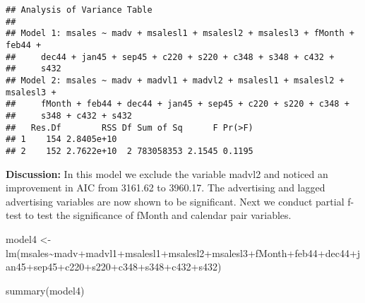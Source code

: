 \documentclass[
]{article}
\newenvironment{Shaded}{\begin{snugshade}}{\end{snugshade}}
\newcommand{\FunctionTok}[1]{\textcolor[rgb]{0.00,0.00,0.00}{#1}}
\newcommand{\NormalTok}[1]{#1}
\newcommand{\OtherTok}[1]{\textcolor[rgb]{0.56,0.35,0.01}{#1}}
\newcommand{\SpecialCharTok}[1]{\textcolor[rgb]{0.00,0.00,0.00}{#1}}
\begin{document}
\begin{verbatim}
## Analysis of Variance Table
## 
## Model 1: msales ~ madv + msalesl1 + msalesl2 + msalesl3 + fMonth + feb44 + 
##     dec44 + jan45 + sep45 + c220 + s220 + c348 + s348 + c432 + 
##     s432
## Model 2: msales ~ madv + madvl1 + madvl2 + msalesl1 + msalesl2 + msalesl3 + 
##     fMonth + feb44 + dec44 + jan45 + sep45 + c220 + s220 + c348 + 
##     s348 + c432 + s432
##   Res.Df        RSS Df Sum of Sq      F Pr(>F)
## 1    154 2.8405e+10                           
## 2    152 2.7622e+10  2 783058353 2.1545 0.1195
\end{verbatim}

\textbf{Discussion:} In this model we exclude the variable madvl2 and
noticed an improvement in AIC from 3161.62 to 3960.17. The advertising
and lagged advertising variables are now shown to be significant. Next
we conduct partial f-test to test the significance of fMonth and
calendar pair variables.

\begin{Shaded}
\begin{Highlighting}[]
\NormalTok{model4 }\OtherTok{\textless{}{-}} \FunctionTok{lm}\NormalTok{(msales}\SpecialCharTok{\textasciitilde{}}\NormalTok{madv}\SpecialCharTok{+}\NormalTok{madvl1}\SpecialCharTok{+}\NormalTok{msalesl1}\SpecialCharTok{+}\NormalTok{msalesl2}\SpecialCharTok{+}\NormalTok{msalesl3}\SpecialCharTok{+}\NormalTok{fMonth}\SpecialCharTok{+}\NormalTok{feb44}\SpecialCharTok{+}\NormalTok{dec44}\SpecialCharTok{+}\NormalTok{jan45}\SpecialCharTok{+}\NormalTok{sep45}\SpecialCharTok{+}\NormalTok{c220}\SpecialCharTok{+}\NormalTok{s220}\SpecialCharTok{+}\NormalTok{c348}\SpecialCharTok{+}\NormalTok{s348}\SpecialCharTok{+}\NormalTok{c432}\SpecialCharTok{+}\NormalTok{s432)}

\FunctionTok{summary}\NormalTok{(model4)}
\end{Highlighting}
\end{Shaded}
\end{document}
